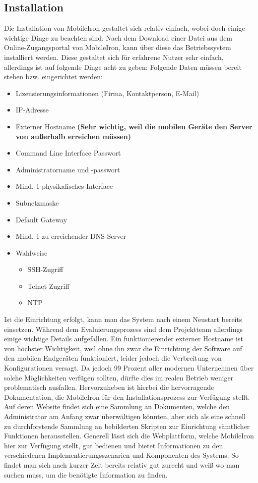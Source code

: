 \subsection{Installation}
Die Installation von MobileIron gestaltet sich relativ einfach, wobei doch einige wichtige Dinge zu beachten sind. Nach dem Download einer Datei aus dem Online-Zugangsportal von MobileIron, kann über diese das Betriebssystem installiert werden. Diese gestaltet sich für erfahrene Nutzer sehr einfach, allerdings ist auf folgende Dinge acht zu geben: \newline
Folgende Daten müssen bereit stehen bzw. eingerichtet werden:
\begin{itemize}
	\item Lizensierungsinformationen (Firma, Kontaktperson, E-Mail)
	\item IP-Adresse
	\item Externer Hostname \textbf{(Sehr wichtig, weil die mobilen Geräte den Server von außerhalb erreichen müssen)}
	\item Command Line Interface Passwort
	\item Administratorname und -passwort
	\item Mind. 1 physikalisches Interface
	\item Subnetzmaske
	\item Default Gateway
	\item Mind. 1 zu erreichender DNS-Server
	\item Wahlweise
	\begin{itemize}
		\item SSH-Zugriff
		\item Telnet Zugriff
		\item NTP
	\end{itemize}
\end{itemize}
Ist die Einrichtung erfolgt, kann man das System nach einem Neustart bereits einsetzen. Während dem Evaluierungsprozess sind dem Projektteam allerdings einige wichtige Details aufgefallen. Ein funktionierender externer Hostname ist von höchster Wichtigkeit, weil ohne ihn zwar die Einrichtung der Software auf den mobilen Endgeräten funktioniert, leider jedoch die Verbreitung von Konfigurationen versagt. Da jedoch 99 Prozent aller modernen Unternehmen über solche Möglichkeiten verfügen sollten, dürfte dies im realen Betrieb weniger problematisch ausfallen. Hervorzuheben ist hierbei die hervorragende Dokumentation, die MobileIron für den Installationsprozess zur Verfügung stellt. Auf deren Website findet sich eine Sammlung an Dokumenten, welche den Administrator am Anfang zwar überwältigen könnten, aber sich als eine schnell zu durchforstende Sammlung an bebilderten Skripten zur Einrichtung sämtlicher Funktionen herausstellen. Generell lässt sich die Webplattform, welche MobileIron hier zur Verfügung stellt, gut bedienen und bietet Informationen zu den verschiedenen Implementierungsszenarien und Komponenten des Systems. So findet man sich nach kurzer Zeit bereits relativ gut zurecht und weiß wo man suchen muss, um die benötigte Information zu finden.

